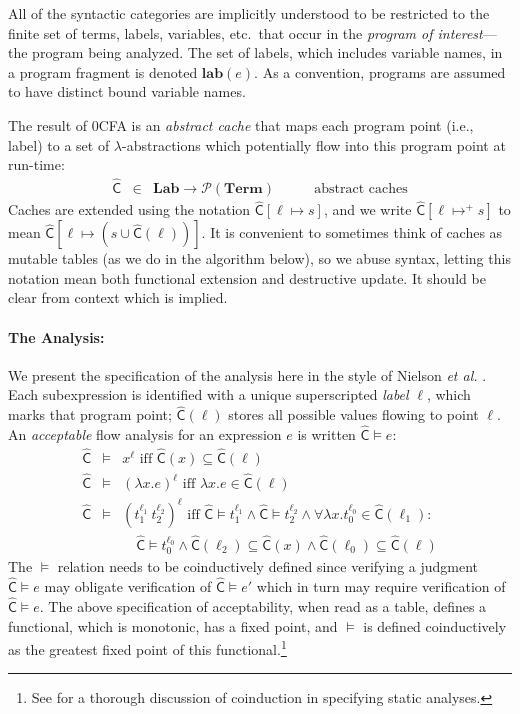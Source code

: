 \documentclass{llncs}
\newcommand\lab[1]{\ensuremath{\mathbf{lab}(#1)}}
\newcommand\cache{\widehat{\mathsf{C}}}
\newcommand\Lab{\mathbf{Lab}}
\newcommand\Term{\mathbf{Term}}
\begin{document}
All of the syntactic categories are implicitly understood to be
restricted to the finite set of terms, labels, variables, etc.~that
occur in the {\em program of interest}---the program being analyzed.
The set of labels, which includes variable names, in a program
fragment is denoted $\lab{e}$.  As a convention, programs are assumed
to have distinct bound variable names.

The result of 0CFA is an {\em abstract cache} that maps each program
point (i.e., label) to a set of $\lambda$-abstractions which
potentially flow into this program point at run-time:
\begin{displaymath}
\begin{array}{ccll}
\cache & \in & \Lab \rightarrow
\mathcal{P}(\Term) & \qquad\mbox{abstract caches}
\end{array}
\end{displaymath}
Caches are extended using the notation $\cache[\ell \mapsto s]$, and
we write $\cache[\ell \mapsto^+ s]$ to mean $\cache[\ell \mapsto
(s\cup \cache(\ell))]$.  It is convenient to sometimes think of caches
as mutable tables (as we do in the algorithm below), so we abuse
syntax, letting this notation mean both functional extension and
destructive update.  It should be clear from context which is implied.

\paragraph{The Analysis:} We present the specification of the analysis here in the style of
Nielson {\em et al.} \cite{nielson-nielson-hankin}.  Each
subexpression is identified with a unique superscripted {\em label}
$\ell$, which marks that program point; $\cache(\ell)$ stores all
possible values flowing to point $\ell$.  An {\em acceptable} flow
analysis for an expression $e$ is written $\cache\models e$:
\begin{eqnarray*}
\cache &\models & 
x^\ell \mbox{ iff } \cache(x) \subseteq \cache(\ell)\\
\cache &\models & 
(\lambda x .e)^\ell \mbox{ iff } \lambda x.e \in \cache(\ell)\\
\cache &\models & 
(t_1^{\ell_1}\ t_2^{\ell_2})^\ell \mbox{ iff } \cache\models t_1^{\ell_1} \wedge
\cache\models t_2^{\ell_2} \wedge \forall \lambda x.t_0^{\ell_0} \in \cache(\ell_1) : \\
\ & \ & \quad
  \cache\models t_0^{\ell_0} \wedge \cache(\ell_2) \subseteq \cache(x) \wedge
  \cache(\ell_0) \subseteq \cache(\ell)
\end{eqnarray*}
The $\models$ relation needs to be coinductively defined since
verifying a judgment $\cache \models e$ may obligate verification of
$\cache \models e'$ which in turn may require verification of $\cache
\models e$.  The above specification of acceptability, when read as a
table, defines a functional, which is monotonic,
has a fixed point, and $\models$ is defined coinductively as the
greatest fixed point of this functional.\footnote{See
\cite{nielson-nielson-hankin} for a thorough discussion of coinduction
in specifying static analyses.}
\end{document}
